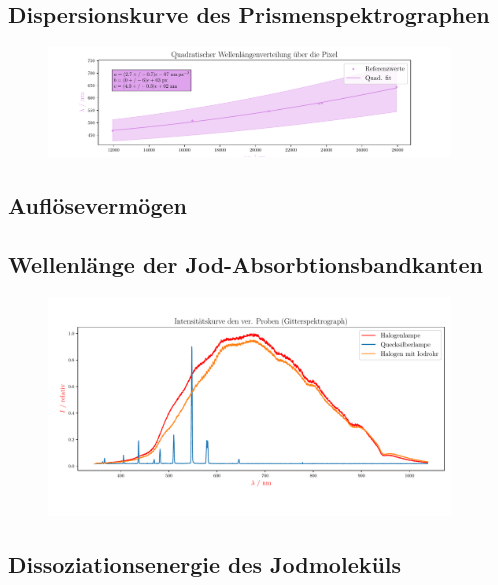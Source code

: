 \documentclass[12pt,english,ngerman]{scrartcl}
\begin{document}
\subsection{Dispersionskurve des Prismenspektrographen}

\begin{figure}[H]
	\begin{center}
		\includegraphics[width=0.95\textwidth]{figures/mappingPxToWaveLength.pdf}
	\end{center}
	\caption{}\label{fig:dispersionkurve}
\end{figure}

\subsection{Auflösevermögen}

\subsection{Wellenlänge der Jod-Absorbtionsbandkanten}

\begin{figure}[H]
	\begin{center}
		\includegraphics[width=0.95\textwidth]{figures/intensity_spektrum_gitter.pdf}
	\end{center}
	\caption{}\label{fig:spektraGitter}
\end{figure}

\subsection{Dissoziationsenergie des Jodmoleküls}
\end{document}
